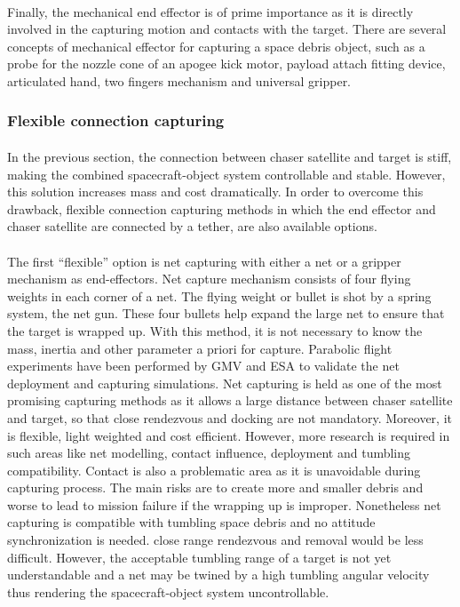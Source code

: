 \paragraph{}Finally, the mechanical end effector is of prime importance as it is directly involved in the capturing motion and contacts with the target. There are several concepts of mechanical effector for capturing a space debris object, such as a probe for the nozzle cone of an apogee kick motor, payload attach fitting device, articulated hand, two fingers mechanism and universal gripper.
\subsubsection{Flexible connection capturing}
\paragraph{}In the previous section, the connection between chaser satellite and target is stiff, making the combined spacecraft-object system controllable and stable. However, this solution increases mass and cost dramatically. In order to overcome this drawback, flexible connection capturing methods in which the end effector and chaser satellite are connected by a tether, are also available options.
\paragraph{}The first “flexible” option is net capturing with either a net or a gripper mechanism as end-effectors. Net capture mechanism consists of four flying weights in each corner of a net. The flying weight or bullet is shot by a spring system, the net gun. These four bullets help expand the large net to ensure that the target is wrapped up. With this method, it is not necessary to know the mass, inertia and other parameter a priori for capture. Parabolic flight experiments have been performed by GMV and ESA to validate the net deployment and capturing simulations. Net capturing is held as one of the most promising capturing methods as it allows a large distance between chaser satellite and target, so that close rendezvous and docking are not mandatory. Moreover, it is flexible, light weighted and cost efficient. However, more research is required in such areas like net modelling, contact influence, deployment and tumbling compatibility. Contact is also a problematic area as it is unavoidable during capturing process. The main risks are to create more and smaller debris and worse to lead to mission failure if the wrapping up is improper. Nonetheless net capturing  is compatible with tumbling space debris and no attitude synchronization is needed. close range rendezvous and removal would be less difficult. However, the acceptable tumbling range of a target is not yet understandable and a net may be twined by a high tumbling angular velocity thus rendering the spacecraft-object system uncontrollable.
